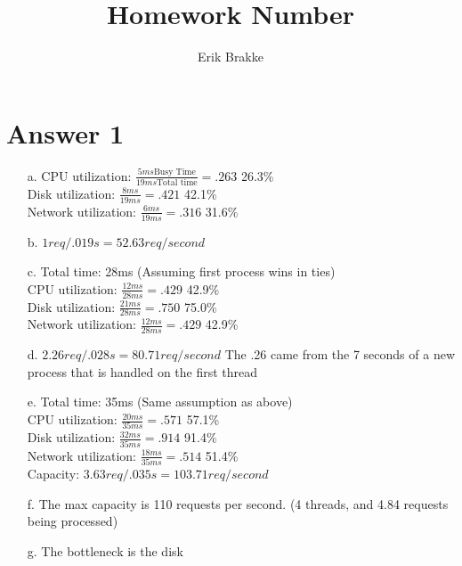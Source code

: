 \documentclass[11pt]{article}
\theoremstyle{definition}
\begin{document}
\title{Homework Number}
\author{Erik Brakke}
\maketitle

\thispagestyle{fancy} 
 
\section*{Answer 1}
\begin{enumerate}
	\item[a.]  CPU utilization: $\frac{5ms \text{Busy Time}}{19ms \text{Total time}} = .263$ 26.3\%\\
	Disk utilization: $\frac{8ms}{19ms} = .421$ 42.1\%\\
	Network utilization: $\frac{6ms}{19ms} = .316$ 31.6\%

	\item[b.] $1 req / .019s = 52.63req / second$

	\item[c.] Total time: 28ms (Assuming first process wins in ties)\\
	CPU utilization: $\frac{12ms}{28ms} = .429$ 42.9\%\\
	Disk utilization: $\frac{21ms}{28ms} = .750$ 75.0\%\\
	Network utilization: $\frac{12ms}{28ms} = .429$ 42.9\%\\

	\item[d.] $2.26 req / .028s = 80.71req/second$ The .26 came from the 7 seconds of a new process that is handled on the first thread

	\item[e.] Total time: 35ms (Same assumption as above)\\
	CPU utilization: $\frac{20ms}{35ms} = .571$ 57.1\%\\
	Disk utilization: $\frac{32ms}{35ms} = .914$ 91.4\%\\
	Network utilization: $\frac{18ms}{35ms} = .514$ 51.4\%\\
	Capacity: $3.63 req / .035s = 103.71req/second$

	\item[f.] The max capacity is 110 requests per second.  (4 threads, and 4.84 requests being processed)
	\item[g.] The bottleneck is the disk
\end{enumerate}
\end{document}
